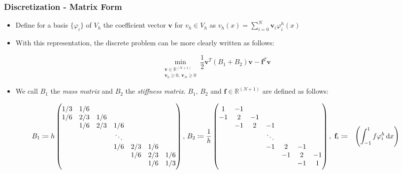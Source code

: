 \begin{frame}
	\frametitle{Discretization - Matrix Form}
	\begin{itemize}
		\item Define for a basis $\{\varphi_i\}$ of $V_h$ the coefficient vector $\mathbf{v}$ for $v_h \in V_h$ as $	v_h(x) = \sum_{i=0}^{N} \mathbf{v}_i \varphi_i^h(x)$
		\item With this representation, the discrete problem can be more clearly written as follows:
	\end{itemize}
		\begin{equation} \label{eq:matrix_formulation}
	\min_{\substack{\mathbf{v} \in \mathbb{R}^{(N+1)}\\ \mathbf{v}_{0} \geq 0,\, \mathbf{v}_N \geq 0}} \frac{1}{2} \mathbf{v}^T (B_1 + B_2) \mathbf{v} - \mathbf{f}^T  \mathbf{v}
\end{equation}
\vspace{-0.8cm}
\begin{itemize}
	\item We call $B_1$ the \emph{mass matrix} and $B_2$ the \emph{stiffness matrix}. $B_1$, $B_2$ and $\mathbf{f} \in \mathbb{R}^{(N+1)}$ are defined as follows:
\end{itemize}
\vspace{-0.5cm}
\begin{align*}
	B_1 \coloneqq 			h	\begin{pmatrix}
		1/3& 1/6 & & & & & \\
		1/6& 2/3& 1/6 & & & & \\
		& 1/6& 2/3& 1/6 & & & \\
		& & & \ddots & & & \\
		& & & 1/6& 2/3& 1/6 & \\
		& & & & 1/6& 2/3& 1/6 \\
		& & & & & 1/6& 1/3
	\end{pmatrix}, \,
	B_2 \coloneqq \frac{1}{h} 			\begin{pmatrix}
		1& -1 & & & & & \\
		-1& 2& -1 & & & & \\
		& -1& 2& -1 & & & \\
		& & & \ddots & & & \\
		& & & -1& 2& -1 & \\
		& & & & -1& 2& -1 \\
		& & & & & -1& 1
	\end{pmatrix}, \,
	\,
	\mathbf{f}_i \coloneqq \phantom{h} \left(\int_{-1}^1 f\varphi_i^h\dif x\right)
\end{align*}
\end{frame}



